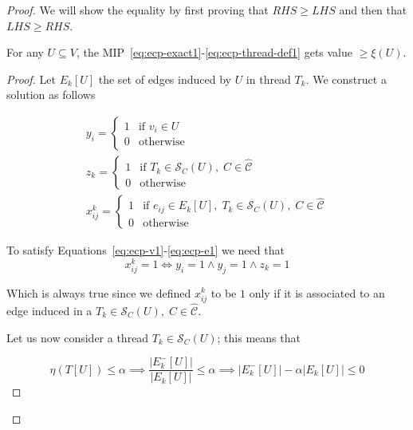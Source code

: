 \begin{proof}
	We will show the equality by first proving that $RHS \geq LHS$ and then
	that $LHS \geq RHS$.

	\begin{claim}
		\label{th:claim-v-b-xi}
		For any $U \subseteq V$, the
		MIP~\ref{eq:ecp-exact1}-\ref{eq:ecp-thread-def1} gets value $\geq \xi(U)$.
	\end{claim}

	\begin{proof}
		Let $E_k[U]$ the set of edges induced by $U$ in thread $T_k$. We construct a solution as follows

		\begin{gather}
			\label{eq:ecpp-y}
			y_i = \begin{cases}
				1 & \text{if } v_{i} \in U \\
				0 & \text{otherwise}
			\end{cases} \\
			\label{eq:ecpp-z}
			z_k = \begin{cases}
				1 & \text{if } T_{k} \in \mathcal{S}_C(U), \; C \in \mathcal{\hat{C}} \\
				0 & \text{otherwise}
			\end{cases} \\
			\label{eq:ecpp-x}
			x_{ij}^{k} = \begin{cases}
				1 & \text{if } e_{ij} \in E_{k}[U], \; T_{k} \in \mathcal{S}_C(U), \; C \in
				\mathcal{\hat{C}}                                                           \\
				0 & \text{otherwise}
			\end{cases}
		\end{gather}

		To satisfy Equations~\ref{eq:ecp-v1}-\ref{eq:ecp-e1} we need that
		\begin{equation}
			\label{eq:ecpp-x-iff}
			x_{ij}^{k} = 1 \iff y_i = 1 \land y_j = 1 \land z_k = 1
		\end{equation}

		Which is always true since we defined $x_{ij}^{k}$ to be $1$ only if it
		is associated to an edge induced in a $T_k \in \mathcal{S}_C(U), \; C \in
			\mathcal{\hat{C}} $.

		Let us now consider a thread $T_k \in \mathcal{S}_C(U)$; this means that

		\begin{equation}
			\eta(T[U]) \leq \alpha \implies \frac{|E^{-}_{k}[U]|}{|E_{k}[U]|} \leq
			\alpha \implies |E^{-}_{k}[U]| - \alpha |E_{k}[U]| \leq 0
		\end{equation}


\end{proof}
\end{proof}
